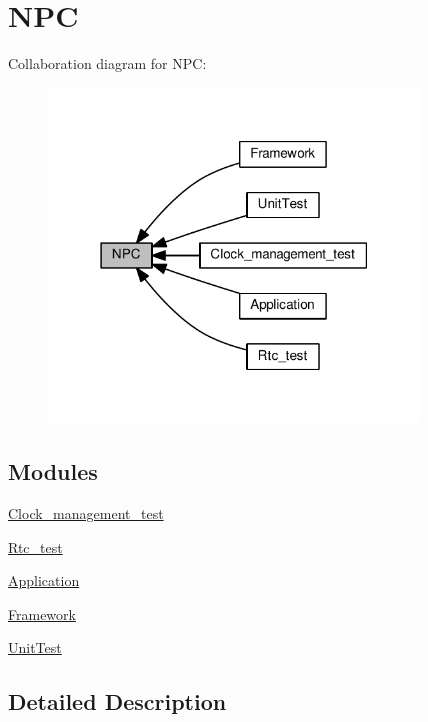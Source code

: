 \hypertarget{group___n_p_c}{}\section{N\+PC}
\label{group___n_p_c}
Collaboration diagram for N\+PC\+:\nopagebreak
\begin{figure}[H]
\begin{center}
\leavevmode
\includegraphics[width=279pt]{dc/da7/group___n_p_c}
\end{center}
\end{figure}
\subsection*{Modules}
\begin{DoxyCompactItemize}
\item 
\hyperlink{group__clock__management__test}{Clock\+\_\+management\+\_\+test}
\item 
\hyperlink{group__rtc__test}{Rtc\+\_\+test}
\item 
\hyperlink{group___application}{Application}
\item 
\hyperlink{group___framework}{Framework}
\item 
\hyperlink{group___unit_test}{Unit\+Test}
\end{DoxyCompactItemize}


\subsection{Detailed Description}
